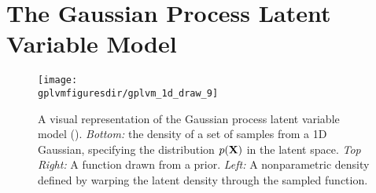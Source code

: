 







\section{The Gaussian Process Latent Variable Model}
\label{sec:gplvm}



\begin{figure}[t]
\begin{centering}
\texttt{[image: \\gplvmfiguresdir/gplvm\_1d\_draw\_9]}
\end{centering}
\caption[One-dimensional Gaussian process latent variable model]{A visual representation of the Gaussian process latent variable model (\gplvm). 
\emph{Bottom:} the density of a set of samples from a 1D Gaussian, specifying the distribution $p(\mathbf{X})$ in the latent space.
\emph{Top Right:} A function drawn from a \gp{} prior.
\emph{Left:} A nonparametric density defined by warping the latent density through the sampled function.} 
\label{fig:oned-gplvm}
\end{figure}



